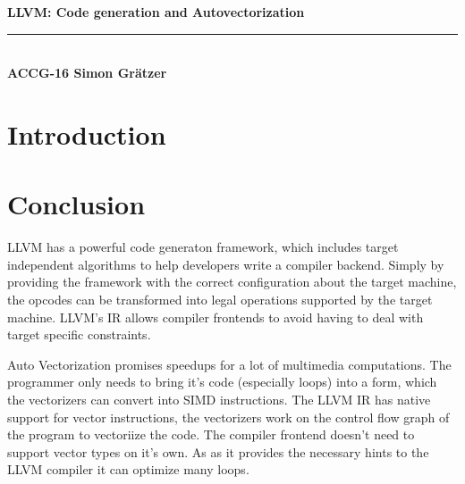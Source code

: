 \documentclass[11pt]{article}
\begin{document}

\noindent
\begin{minipage}{1.0\linewidth}
  {\Large \bf  
    LLVM: Code generation and Autovectorization
  }\\[-1.5mm]
  \noindent\rule{\linewidth}{1pt}\\[-2pt] 
  {\small \bf ACCG-16 \hfill
    Simon Gr\"atzer
  }
\end{minipage}


\section*{Introduction}





\section*{Conclusion}

LLVM has a powerful code generaton framework, which includes target independent
algorithms to help developers write a compiler backend. Simply by providing the framework with
the correct configuration about the target machine, the opcodes can be transformed into 
legal operations supported by the target machine. 
LLVM's IR allows compiler frontends to avoid having to deal with target specific constraints.

Auto Vectorization promises speedups for a lot of multimedia computations. The programmer only needs to 
bring it's code (especially loops) into a form, which the vectorizers can convert into SIMD instructions.
The LLVM IR has native support for vector instructions, the vectorizers work on the control flow graph
of the program to vectoriize the code. 
The compiler frontend doesn't need to support vector types on it's own. As as it provides the necessary hints
to the LLVM compiler it can optimize many loops.



%
%
%


\nocite{*} 


\end{document}
